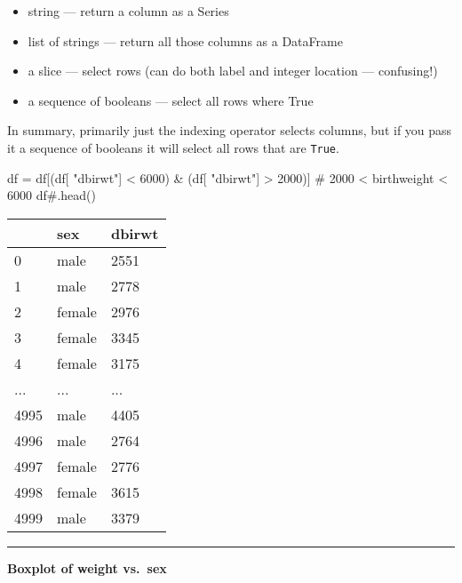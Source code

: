 \documentclass[
  letterpaper,
  DIV=11,
  numbers=noendperiod]{scrreprt}
\newenvironment{Shaded}{\begin{snugshade}}{\end{snugshade}}
\newcommand{\CommentTok}[1]{\textcolor[rgb]{0.37,0.37,0.37}{#1}}
\newcommand{\DecValTok}[1]{\textcolor[rgb]{0.68,0.00,0.00}{#1}}
\newcommand{\NormalTok}[1]{\textcolor[rgb]{0.00,0.23,0.31}{#1}}
\newcommand{\OperatorTok}[1]{\textcolor[rgb]{0.37,0.37,0.37}{#1}}
\newcommand{\StringTok}[1]{\textcolor[rgb]{0.13,0.47,0.30}{#1}}
\providecommand{\tightlist}{%
  \setlength{\itemsep}{0pt}\setlength{\parskip}{0pt}}\usepackage{longtable,booktabs,array}
\begin{document}
\begin{itemize}
\tightlist
\item
  string --- return a column as a Series
\item
  list of strings --- return all those columns as a DataFrame
\item
  a slice --- select rows (can do both label and integer location ---
  confusing!)
\item
  a sequence of booleans --- select all rows where True
\end{itemize}

In summary, primarily just the indexing operator selects columns, but if
you pass it a sequence of booleans it will select all rows that are
\texttt{True}.

\begin{Shaded}
\begin{Highlighting}[]
\NormalTok{df }\OperatorTok{=}\NormalTok{ df[(df[ }\StringTok{"dbirwt"}\NormalTok{] }\OperatorTok{\textless{}} \DecValTok{6000}\NormalTok{) }\OperatorTok{\&}\NormalTok{ (df[ }\StringTok{"dbirwt"}\NormalTok{] }\OperatorTok{\textgreater{}} \DecValTok{2000}\NormalTok{)] }\CommentTok{\# 2000 \textless{} birthweight \textless{} 6000}
\NormalTok{df}\CommentTok{\#.head()}
\end{Highlighting}
\end{Shaded}

\begin{longtable}[]{@{}lll@{}}
\toprule()
& sex & dbirwt \\
\midrule()
\endhead
0 & male & 2551 \\
1 & male & 2778 \\
2 & female & 2976 \\
3 & female & 3345 \\
4 & female & 3175 \\
... & ... & ... \\
4995 & male & 4405 \\
4996 & male & 2764 \\
4997 & female & 2776 \\
4998 & female & 3615 \\
4999 & male & 3379 \\
\bottomrule()
\end{longtable}

\begin{center}\rule{0.5\linewidth}{0.5pt}\end{center}

\textbf{Boxplot of weight vs.~sex}
\end{document}

